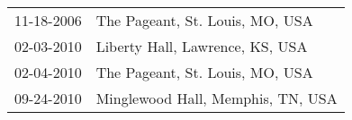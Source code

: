 \begin{supertabular}{ll}
 11-18-2006 &    The Pageant, St. Louis, MO, USA \\
 02-03-2010 &    Liberty Hall, Lawrence, KS, USA \\
 02-04-2010 &    The Pageant, St. Louis, MO, USA \\
 09-24-2010 &  Minglewood Hall, Memphis, TN, USA \\
\end{supertabular}
